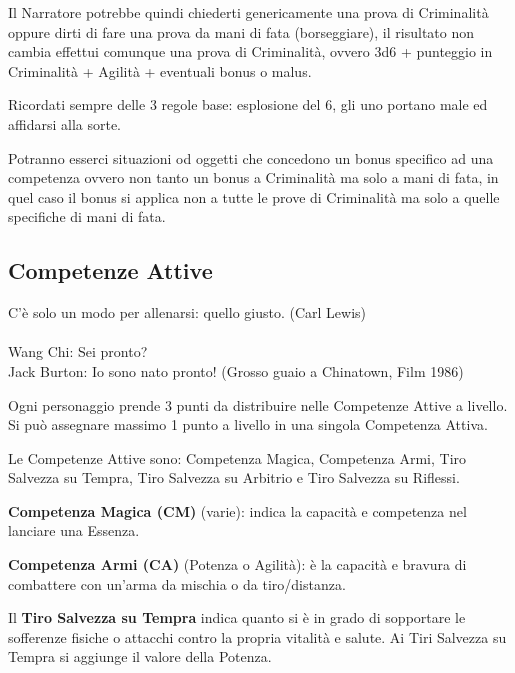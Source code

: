 \documentclass[a4paper,11pt,twoside,openany]{book}
\begin{document}
\bigskip

Il Narratore potrebbe quindi chiederti genericamente una prova di Criminalità oppure dirti di fare una prova da mani di fata (borseggiare), il risultato non cambia effettui comunque una prova di Criminalità, ovvero 3d6 + punteggio in Criminalità + Agilità + eventuali bonus
o malus.

Ricordati sempre delle 3 regole base: esplosione del 6, gli uno portano male ed affidarsi alla sorte.

\bigskip

Potranno esserci situazioni od oggetti che concedono un bonus specifico ad una competenza ovvero non tanto un bonus a Criminalità ma solo a mani di fata, in quel caso il bonus si applica non a tutte le prove di Criminalità ma solo a quelle specifiche di mani di fata.


\subsection{Competenze Attive}

\label{competenze-attive}
\begin{tcolorbox}[enhanced,arc=5pt,boxrule=0.3pt]{C'è solo un modo per allenarsi: quello giusto. (Carl Lewis)\\\\
		Wang Chi: Sei pronto?\\
		Jack Burton: Io sono nato pronto! (Grosso guaio a Chinatown, Film 1986)
	}\end{tcolorbox}\medskip

Ogni personaggio prende 3 punti da distribuire nelle Competenze Attive a livello. Si può assegnare massimo 1 punto a livello in una singola Competenza Attiva.

Le Competenze Attive sono: Competenza Magica, Competenza Armi, Tiro Salvezza su Tempra, Tiro Salvezza su Arbitrio e Tiro Salvezza su Riflessi.

\textbf{Competenza Magica (CM)} (varie): indica la capacità e competenza nel lanciare una Essenza.

\textbf{Competenza Armi (CA)} (Potenza o Agilità): è la capacità e bravura di combattere con un'arma da mischia o da tiro/distanza.

Il \textbf{Tiro Salvezza su Tempra} indica quanto si è in grado di sopportare le sofferenze fisiche o attacchi contro la propria vitalità e salute. Ai Tiri Salvezza su Tempra si aggiunge il valore della Potenza.
\end{document}
